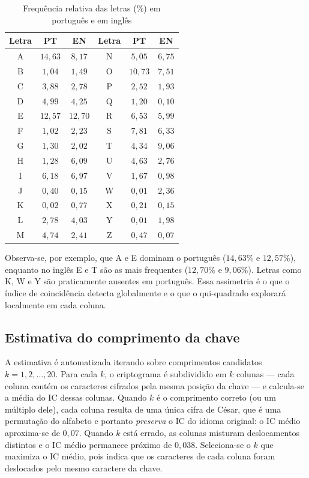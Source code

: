 \documentclass[conference]{IEEEtran}
\begin{document}
\begin{table}[htbp]
\caption{Frequência relativa das letras (\%) em português e em inglês}
\label{tab:freq}
\centering
\footnotesize
\begin{tabular}{@{}cccccc@{}}
\toprule
\textbf{Letra} & \textbf{PT} & \textbf{EN} &
\textbf{Letra} & \textbf{PT} & \textbf{EN} \\
\midrule
A & $14{,}63$ & $8{,}17$ & N & $5{,}05$  & $6{,}75$ \\
B & $1{,}04$  & $1{,}49$ & O & $10{,}73$ & $7{,}51$ \\
C & $3{,}88$  & $2{,}78$ & P & $2{,}52$  & $1{,}93$ \\
D & $4{,}99$  & $4{,}25$ & Q & $1{,}20$  & $0{,}10$ \\
E & $12{,}57$ & $12{,}70$ & R & $6{,}53$  & $5{,}99$ \\
F & $1{,}02$  & $2{,}23$ & S & $7{,}81$  & $6{,}33$ \\
G & $1{,}30$  & $2{,}02$ & T & $4{,}34$  & $9{,}06$ \\
H & $1{,}28$  & $6{,}09$ & U & $4{,}63$  & $2{,}76$ \\
I & $6{,}18$  & $6{,}97$ & V & $1{,}67$  & $0{,}98$ \\
J & $0{,}40$  & $0{,}15$ & W & $0{,}01$  & $2{,}36$ \\
K & $0{,}02$  & $0{,}77$ & X & $0{,}21$  & $0{,}15$ \\
L & $2{,}78$  & $4{,}03$ & Y & $0{,}01$  & $1{,}98$ \\
M & $4{,}74$  & $2{,}41$ & Z & $0{,}47$  & $0{,}07$ \\
\bottomrule
\end{tabular}
\end{table}

Observa-se, por exemplo, que A e E dominam o português ($14{,}63\%$ e
$12{,}57\%$), enquanto no inglês E e T são as mais frequentes ($12{,}70\%$ e
$9{,}06\%$). Letras como K, W e Y são praticamente ausentes em português.
Essa assimetria é o que o índice de coincidência detecta globalmente e o que
o qui-quadrado explorará localmente em cada coluna.

\subsection{Estimativa do comprimento da chave}
A estimativa é automatizada iterando sobre comprimentos candidatos
$k = 1, 2, \dots, 20$. Para cada $k$, o criptograma é subdividido em $k$
colunas --- cada coluna contém os caracteres cifrados pela mesma posição da
chave --- e calcula-se a média do IC dessas colunas. Quando $k$ é o
comprimento correto (ou um múltiplo dele), cada coluna resulta de uma única
cifra de César, que é uma permutação do alfabeto e portanto \emph{preserva} o
IC do idioma original: o IC médio aproxima-se de $0{,}07$. Quando $k$ está
errado, as colunas misturam deslocamentos distintos e o IC médio permanece
próximo de $0{,}038$. Seleciona-se o $k$ que maximiza o IC médio, pois indica
que os caracteres de cada coluna foram deslocados pelo mesmo caractere da
chave.
\end{document}
